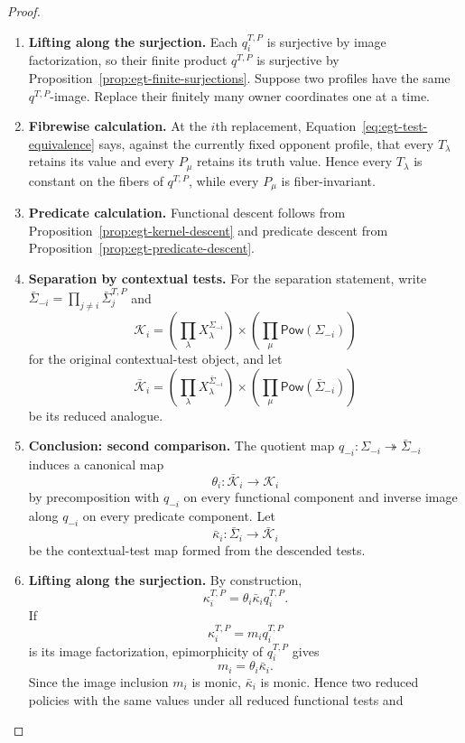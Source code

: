 \documentclass[11pt,a4paper]{article}
\numberwithin{equation}{section}
\theoremstyle{definition}
\theoremstyle{remark}
\theoremstyle{plain}
\begin{document}
\begin{proof}
\leavevmode
\begin{enumerate}[label=\textup{(\arabic*)},leftmargin=*,itemsep=4pt,topsep=3pt]
  \item \textbf{Lifting along the surjection.} Each $q_i^{T,P}$ is surjective by image factorization, so their finite product
$q^{T,P}$ is surjective by Proposition~\ref{prop:egt-finite-surjections}. Suppose two profiles have the same $q^{T,P}$-image. Replace their finitely
many owner coordinates one at a time.
  \item \textbf{Fibrewise calculation.} At the $i$th replacement,
Equation~\eqref{eq:egt-test-equivalence} says, against the currently fixed
opponent profile, that every $T_\lambda$ retains its value and every
$P_\mu$ retains its truth value. Hence every $T_\lambda$ is constant on the
fibers of $q^{T,P}$, while every $P_\mu$ is fiber-invariant.
  \item \textbf{Predicate calculation.} Functional
descent follows from Proposition~\ref{prop:egt-kernel-descent} and predicate
descent from Proposition~\ref{prop:egt-predicate-descent}.
  \item \textbf{Separation by contextual tests.} For the separation statement, write
$\bar\Sigma_{-i}=\prod_{j\ne i}\bar\Sigma_j^{T,P}$ and
\[
 \mathcal K_i=
 \left(\prod_{\lambda}X_\lambda^{\Sigma_{-i}}\right)
 \times
 \left(\prod_{\mu}\mathsf{Pow}(\Sigma_{-i})\right)
\]
for the original contextual-test object, and let
\[
 \bar{\mathcal K}_i=
 \left(\prod_{\lambda}X_\lambda^{\bar\Sigma_{-i}}\right)
 \times
 \left(\prod_{\mu}\mathsf{Pow}(\bar\Sigma_{-i})\right)
\]
be its reduced analogue.
  \item \textbf{Conclusion: second comparison.} The quotient map
$q_{-i}:\Sigma_{-i}\twoheadrightarrow\bar\Sigma_{-i}$ induces a canonical map
\[
 \theta_i:\bar{\mathcal K}_i\longrightarrow\mathcal K_i
\]
by precomposition with $q_{-i}$ on every functional component and inverse
image along $q_{-i}$ on every predicate component. Let
\[
 \bar\kappa_i:\bar\Sigma_i\longrightarrow\bar{\mathcal K}_i
\]
be the contextual-test map formed from the descended tests.
  \item \textbf{Lifting along the surjection.} By construction,
\[
 \kappa_i^{T,P}=\theta_i\bar\kappa_iq_i^{T,P}.
\]
If
\[
 \kappa_i^{T,P}=m_iq_i^{T,P}
\]
is its image factorization, epimorphicity of $q_i^{T,P}$ gives
\[
 m_i=\theta_i\bar\kappa_i.
\]
Since the image inclusion $m_i$ is monic, $\bar\kappa_i$ is monic. Hence two
reduced policies with the same values under all reduced functional tests and

\end{enumerate}
\end{proof}
\end{document}
